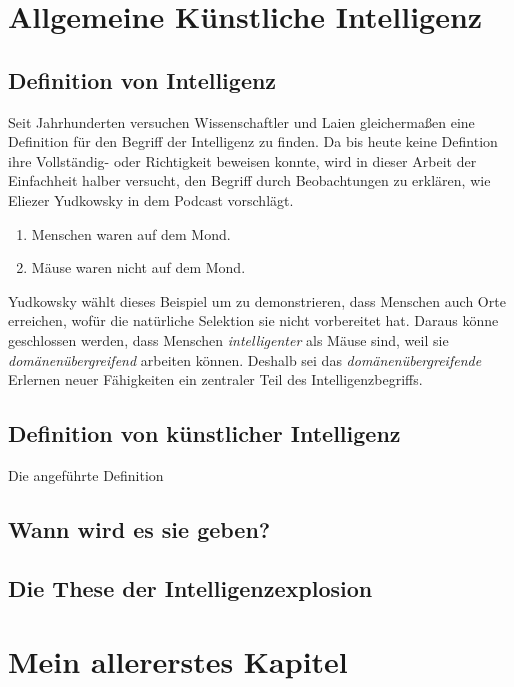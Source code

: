 \chapter{Allgemeine Künstliche Intelligenz}
\section{Definition von Intelligenz}
Seit Jahrhunderten versuchen Wissenschaftler und Laien gleichermaßen eine Definition für den Begriff der Intelligenz zu finden. Da bis heute keine Defintion ihre Vollständig- oder Richtigkeit beweisen konnte, wird in dieser Arbeit der Einfachheit halber versucht, den Begriff durch Beobachtungen zu erklären, wie Eliezer Yudkowsky in dem Podcast  vorschlägt.
\begin{enumerate}
\item Menschen waren auf dem Mond.
\item Mäuse waren nicht auf dem Mond.
\end{enumerate}
Yudkowsky wählt dieses Beispiel um zu demonstrieren, dass Menschen auch Orte erreichen, wofür die natürliche Selektion sie nicht vorbereitet hat. Daraus könne geschlossen werden, dass Menschen \emph{intelligenter} als Mäuse sind, weil sie \emph{domänenübergreifend} arbeiten können. Deshalb sei das \emph{domänenübergreifende} Erlernen neuer Fähigkeiten ein zentraler Teil des Intelligenzbegriffs. 
\section{Definition von künstlicher Intelligenz}

Die angeführte Definition
\section{Wann wird es sie geben?}
\section{Die These der Intelligenzexplosion}



\chapter{Mein allererstes Kapitel}
